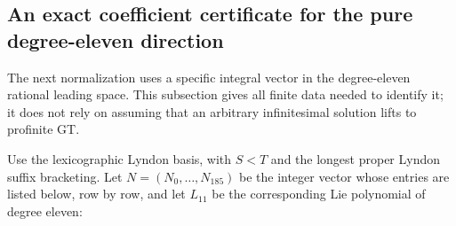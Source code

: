 \subsection{An exact coefficient certificate for the pure degree-eleven direction}
\label{subsec:fr-pure-eleven-certificate}

The next normalization uses a specific integral vector in the
degree-eleven rational leading space. This subsection gives all
finite data needed to identify it; it does not rely on assuming
that an arbitrary infinitesimal solution lifts to profinite GT.

Use the lexicographic Lyndon basis, with $S<T$ and the longest
proper Lyndon suffix bracketing. Let $N=(N_0,\ldots,N_{185})$ be
the integer vector whose entries are listed below, row by row,
and let $L_{11}$ be the corresponding Lie polynomial of degree
eleven:
